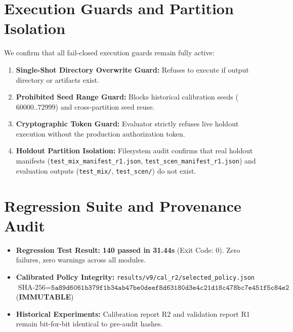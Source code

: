 \documentclass[10pt,a4paper]{article}
\begin{document}
\section{Execution Guards and Partition Isolation}
We confirm that all fail-closed execution guards remain fully active:
\begin{enumerate}
    \item \textbf{Single-Shot Directory Overwrite Guard:} Refuses to execute if output directory or artifacts exist.
    \item \textbf{Prohibited Seed Range Guard:} Blocks historical calibration seeds ($60000..72999$) and cross-partition seed reuse.
    \item \textbf{Cryptographic Token Guard:} Evaluator strictly refuses live holdout execution without the production authorization token.
    \item \textbf{Holdout Partition Isolation:} Filesystem audit confirms that real holdout manifests (\texttt{test\_mix\_manifest\_r1.json}, \texttt{test\_scen\_manifest\_r1.json}) and evaluation outputs (\texttt{test\_mix/}, \texttt{test\_scen/}) do not exist.
\end{enumerate}

\section{Regression Suite and Provenance Audit}
\begin{itemize}
    \item \textbf{Regression Test Result:} \textbf{140 passed in 31.44s} (Exit Code: 0). Zero failures, zero warnings across all modules.
    \item \textbf{Calibrated Policy Integrity:} \texttt{results/v9/cal\_r2/selected\_policy.json} \\
    $\text{SHA-256} = \texttt{5a89d6061b379f1b34ab47be0deef8d63180d3e4c21d18c478bc7e451f5c84e2}$ (\textbf{IMMUTABLE})
    \item \textbf{Historical Experiments:} Calibration report R2 and validation report R1 remain bit-for-bit identical to pre-audit hashes.
\end{itemize}
\end{document}
